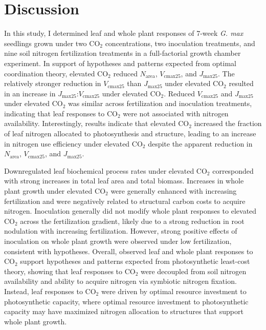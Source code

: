 \section{Discussion}
\noindent In this study, I determined leaf and whole plant responses of 7-week \textit{G. max} seedlings grown under two CO$_2$ concentrations, two inoculation treatments, and nine soil nitrogen fertilization treatments in a full-factorial growth chamber experiment. In support of hypotheses and patterns expected from optimal coordination theory, elevated CO$_2$ reduced $N_\mathrm{area}$, $V_\mathrm{cmax25}$, and $J_\mathrm{max25}$. The relatively stronger reduction in $V_\mathrm{cmax25}$ than $J_\mathrm{max25}$ under elevated CO$_2$ resulted in an increase in $J_\mathrm{max25}$:$V_\mathrm{cmax25}$ under elevated CO$_2$. Reduced $V_\mathrm{cmax25}$ and $J_\mathrm{max25}$ under elevated CO$_2$ was similar across fertilization and inoculation treatments, indicating that leaf responses to CO$_2$ were not associated with nitrogen availability. Interestingly, results indicate that elevated CO$_2$ increased the fraction of leaf nitrogen allocated to photosynthesis and structure, leading to an increase in nitrogen use efficiency under elevated CO$_2$ despite the apparent reduction in $N_\mathrm{area}$, $V_\mathrm{cmax25}$, and $J_\mathrm{max25}$.

Downregulated leaf biochemical process rates under elevated CO$_2$ corresponded with strong increases in total leaf area and total biomass. Increases in whole plant growth under elevated CO$_2$ were generally enhanced with increasing fertilization and were negatively related to structural carbon costs to acquire nitrogen. Inoculation generally did not modify whole plant responses to elevated CO$_2$ across the fertilization gradient, likely due to a strong reduction in root nodulation with increasing fertilization. However, strong positive effects of inoculation on whole plant growth were observed under low fertilization, consistent with hypotheses. Overall, observed leaf and whole plant responses to CO$_2$ support hypotheses and patterns expected from photosynthetic least-cost theory, showing that leaf responses to CO$_2$ were decoupled from soil nitrogen availability and ability to acquire nitrogen via symbiotic nitrogen fixation. Instead, leaf responses to CO$_2$ were driven by optimal resource investment to photosynthetic capacity, where optimal resource investment to photosynthetic capacity may have maximized nitrogen allocation to structures that support whole plant growth.

